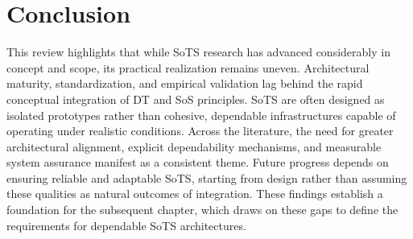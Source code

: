 \section{Conclusion}\label{sec:literature-review-conclusion}
This review highlights that while SoTS research has advanced considerably in concept and scope, its practical realization remains uneven.
Architectural maturity, standardization, and empirical validation lag behind the rapid conceptual integration of DT and SoS principles. SoTS are often designed as isolated prototypes rather than cohesive, dependable infrastructures capable of operating under realistic conditions. Across the literature, the need for greater architectural alignment, explicit dependability mechanisms, and measurable system assurance manifest as a consistent theme. Future progress depends on ensuring reliable and adaptable SoTS, starting from design rather than assuming these qualities as natural outcomes of integration. These findings establish a foundation for the subsequent chapter, which draws on these gaps to define the requirements for dependable SoTS architectures. 